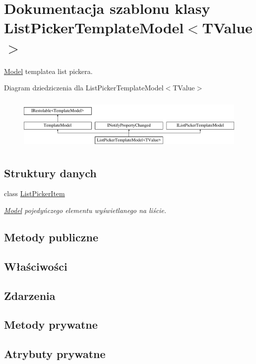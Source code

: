 \hypertarget{a00037}{}\section{Dokumentacja szablonu klasy List\+Picker\+Template\+Model$<$T\+Value$>$}
\label{a00037}


\hyperlink{a00284}{Model} templatea list pickera.  


Diagram dziedziczenia dla List\+Picker\+Template\+Model$<$T\+Value$>$\begin{figure}[H]
\begin{center}
\leavevmode
\includegraphics[height=2.616822cm]{d1/dc6/a00037}
\end{center}
\end{figure}
\subsection*{Struktury danych}
\begin{DoxyCompactItemize}
\item 
class \hyperlink{a00035}{List\+Picker\+Item}
\begin{DoxyCompactList}\small\item\em \hyperlink{a00284}{Model} pojedyńczego elementu wyświetlanego na liście. \end{DoxyCompactList}\end{DoxyCompactItemize}
\subsection*{Metody publiczne}
\subsection*{Właściwości}
\subsection*{Zdarzenia}
\subsection*{Metody prywatne}
\subsection*{Atrybuty prywatne}


